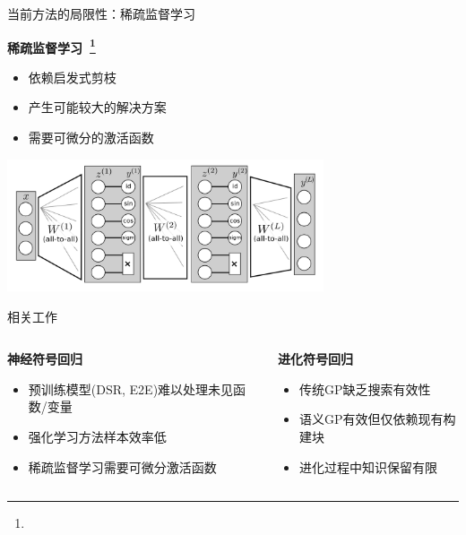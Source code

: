 \documentclass[aspectratio=1610]{beamer}
\begin{document}
    \begin{frame}{当前方法的局限性：稀疏监督学习}

        \begin{center}
            \textbf{稀疏监督学习~\footnote{}}
            \begin{itemize}
                \item 依赖启发式剪枝
                \item 产生可能较大的解决方案
                \item 需要可微分的激活函数
            \end{itemize}
            \includegraphics[width=0.7\textwidth]{figs/EQL.png}
        \end{center}
    \end{frame}


    \begin{frame}{相关工作}
        \begin{columns}
            \begin{column}{0.48\textwidth}
                \textbf{神经符号回归}
                \begin{itemize}
                    \item 预训练模型(DSR, E2E)难以处理未见函数/变量
                    \item 强化学习方法样本效率低
                    \item 稀疏监督学习需要可微分激活函数
                \end{itemize}
            \end{column}
            \begin{column}{0.48\textwidth}
                \textbf{进化符号回归}
                \begin{itemize}
                    \item 传统GP缺乏搜索有效性
                    \item 语义GP有效但仅依赖现有构建块
                    \item 进化过程中知识保留有限
                \end{itemize}
            \end{column}
        \end{columns}
    \end{frame}
\end{document}
